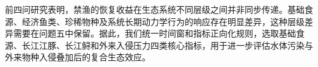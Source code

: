 前四问研究表明，禁渔的恢复收益在生态系统不同层级之间并非同步传递。基础食源、经济鱼类、珍稀物种及系统长期动力学行为的响应存在明显差异，这种层级差异需要在问题五中保留。据此，我们统一时间窗和指标正向化规则，选取基础食源、长江江豚、长江鲟和外来入侵压力四类核心指标，用于进一步评估水体污染与外来物种入侵叠加后的复合生态效应。